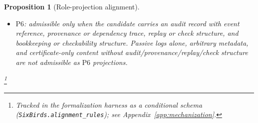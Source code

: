 \documentclass[11pt]{article}
\newtheorem{proposition}[theorem]{Proposition}
\theoremstyle{definition}
\newcommand{\Pfive}{\ensuremath{\mathrm{P5}}}
\newcommand{\Psix}{\ensuremath{\mathrm{P6}}}
\begin{document}
\begin{proposition}[Role-projection alignment]
\begin{itemize}[topsep=2pt,itemsep=1pt]
    topologies or geometries merely because they have paths, and causal
    chains are not admissible as \Pfive{} projections unless quotient
    or packaging data is present.
  \item \Psix{}: admissible only when the candidate carries an audit
    record with event reference, provenance or dependency trace, replay
    or check structure, and bookkeeping or checkability structure.
    Passive logs alone, arbitrary metadata, and certificate-only
    content without audit/provenance/replay/check structure are not
    admissible as \Psix{} projections.
\end{itemize}\footnote{Tracked in the formalization harness as a conditional schema (\texttt{SixBirds.alignment\_rules}); see Appendix~\ref{app:mechanization}.}
\end{proposition}
\end{document}

